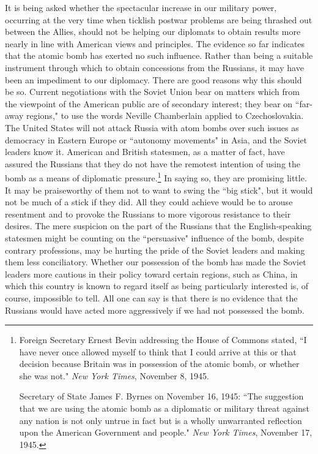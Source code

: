 It is being asked whether the spectacular increase in our military power, occurring at the very time when ticklish postwar problems are being thrashed out between the Allies, should not be helping our diplomats to obtain results more nearly in line with American views and principles. The evidence so far indicates that the atomic bomb has exerted no such influence. Rather than being a suitable instrument through which to obtain concessions from the Russians, it may have been an impediment to our diplomacy. There are good reasons why this should be so. Current negotiations with the Soviet Union bear on matters which from the viewpoint of the American public are of secondary interest; they bear on ``far-away regions," to use the words Neville Chamberlain applied to Czechoslovakia. The United States will not attack Russia with atom bombs over such issues as democracy in Eastern Europe or ``autonomy movements" in Asia, and the Soviet leaders know it. American and British statesmen, as a matter of fact, have assured the Russians that they do not have the remotest intention of using the bomb as a means of diplomatic pressure.\footnote{Foreign Secretary Ernest Bevin addressing the House of Commons stated, ``I have never once allowed myself to think that I could arrive at this or that decision because Britain was in possession of the atomic bomb, or whether she was not." \textit{New York Times}, November 8, 1945.

Secretary of State James F. Byrnes on November 16, 1945: ``The suggestion that we are using the atomic bomb as a diplomatic or military threat against any nation is not only untrue in fact but is a wholly unwarranted reflection upon the American Government and people." \textit{New York Times}, November 17, 1945.} In saying so, they are promising little. It may be praiseworthy of them not to want to swing the ``big stick", but it would not be much of a stick if they did. All they could achieve would be to arouse resentment and to provoke the Russians to more vigorous resistance to their desires. The mere suspicion on the part of the Russians that the English-speaking statesmen might be counting on the ``persuasive" influence of the bomb, despite contrary professions, may be hurting the pride of the Soviet leaders and making them less conciliatory. Whether our possession of the bomb has made the Soviet leaders more cautious in their policy toward certain regions, such as China, in which this country is known to regard itself as being particularly interested is, of course, impossible to tell. All one can say is that there is no evidence that the Russians would have acted more aggressively if we had not possessed the bomb.

